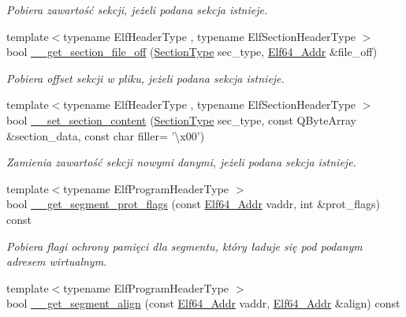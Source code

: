 \begin{DoxyCompactItemize}
\begin{DoxyCompactList}\small\item\em Pobiera zawartość sekcji, jeżeli podana sekcja istnieje. \end{DoxyCompactList}\item 
{\footnotesize template$<$typename Elf\-Header\-Type , typename Elf\-Section\-Header\-Type $>$ }\\bool \hyperlink{class_e_l_f_aaf393ee93c55e49fd2c6a6696b53d708}{\-\_\-\-\_\-get\-\_\-section\-\_\-file\-\_\-off} (\hyperlink{class_e_l_f_abaebdfb7048441e430684d68df8d73d1}{Section\-Type} sec\-\_\-type, \hyperlink{elf_8h_aeed51d08e3a950d637f8ec1f0cd4ef65}{Elf64\-\_\-\-Addr} \&file\-\_\-off)
\begin{DoxyCompactList}\small\item\em Pobiera offset sekcji w pliku, jeżeli podana sekcja istnieje. \end{DoxyCompactList}\item 
{\footnotesize template$<$typename Elf\-Header\-Type , typename Elf\-Section\-Header\-Type $>$ }\\bool \hyperlink{class_e_l_f_a69450dcdb097595f3039142e3203c717}{\-\_\-\-\_\-set\-\_\-section\-\_\-content} (\hyperlink{class_e_l_f_abaebdfb7048441e430684d68df8d73d1}{Section\-Type} sec\-\_\-type, const Q\-Byte\-Array \&section\-\_\-data, const char filler= '\textbackslash{}x00')
\begin{DoxyCompactList}\small\item\em Zamienia zawartość sekcji nowymi danymi, jeżeli podana sekcja istnieje. \end{DoxyCompactList}\item 
{\footnotesize template$<$typename Elf\-Program\-Header\-Type $>$ }\\bool \hyperlink{class_e_l_f_a585949d9d51084cace56893a4e84d659}{\-\_\-\-\_\-get\-\_\-segment\-\_\-prot\-\_\-flags} (const \hyperlink{elf_8h_aeed51d08e3a950d637f8ec1f0cd4ef65}{Elf64\-\_\-\-Addr} vaddr, int \&prot\-\_\-flags) const 
\begin{DoxyCompactList}\small\item\em Pobiera flagi ochrony pamięci dla segmentu, który ładuje się pod podanym adresem wirtualnym. \end{DoxyCompactList}\item 
{\footnotesize template$<$typename Elf\-Program\-Header\-Type $>$ }\\bool \hyperlink{class_e_l_f_ab9819efee39857b02b6eaa7e96333cc0}{\-\_\-\-\_\-get\-\_\-segment\-\_\-align} (const \hyperlink{elf_8h_aeed51d08e3a950d637f8ec1f0cd4ef65}{Elf64\-\_\-\-Addr} vaddr, \hyperlink{elf_8h_aeed51d08e3a950d637f8ec1f0cd4ef65}{Elf64\-\_\-\-Addr} \&align) const 

\end{DoxyCompactItemize}
